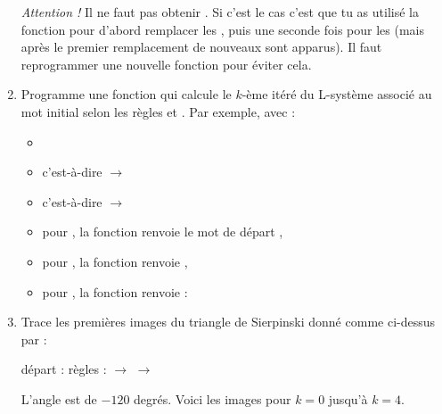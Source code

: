 \documentclass[11pt,class=report,crop=false]{standalone}
\begin{document}
\begin{activite}
\begin{enumerate}
\emph{Attention !} Il ne faut pas obtenir . Si c'est le cas c'est que tu as utilisé la fonction  pour d'abord remplacer les , puis une seconde fois pour les  (mais après le premier remplacement de nouveaux  sont apparus). Il faut reprogrammer une nouvelle fonction pour éviter cela. 

 
  \item Programme une fonction 
  qui calcule le $k$-ème itéré du L-système associé au mot initial  selon les règles  et .
   Par exemple, avec :
  \begin{itemize} 
    \item {}
    \item {} c'est-à-dire  $\rightarrow$ 
    \item {} c'est-à-dire  $\rightarrow$   
    \item pour , la fonction renvoie le mot de départ ,
    \item pour , la fonction renvoie ,
    \item pour , la fonction renvoie :\\ 
    \centerline{}
  \end{itemize}  

  \item Trace les premières images du triangle de Sierpinski donné comme ci-dessus par : \\
  \centerline{départ :  \qquad règles :  $\rightarrow$  \quad {} $\rightarrow$ } 
 L'angle est de $-120$ degrés. Voici les images pour $k=0$ jusqu'à $k=4$.
  

\end{enumerate}
\end{activite}
\end{document}
